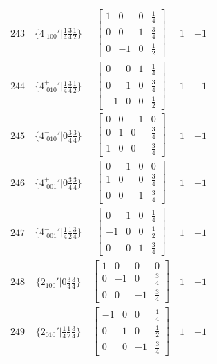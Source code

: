 \documentclass[fleqn,8pt]{jsarticle}
\begin{document}
\begin{longtable}{ccccc}
$ 243 $ & $ \{4^{-}_{\,\,100}{}'|\frac{1}{4} \frac{3}{4} \frac{1}{2}\} $ & $ \begin{bmatrix} 1 & 0 & 0 & \frac{1}{4} \\ 0 & 0 & 1 & \frac{3}{4} \\ 0 & -1 & 0 & \frac{1}{2} \end{bmatrix} $ & $ 1 $ & $ -1 $ \\ \hline
$ 244 $ & $ \{4^{+}_{\,\,010}{}'|\frac{1}{4} \frac{3}{4} \frac{1}{2}\} $ & $ \begin{bmatrix} 0 & 0 & 1 & \frac{1}{4} \\ 0 & 1 & 0 & \frac{3}{4} \\ -1 & 0 & 0 & \frac{1}{2} \end{bmatrix} $ & $ 1 $ & $ -1 $ \\ \hline
$ 245 $ & $ \{4^{-}_{\,\,010}{}'|0 \frac{3}{4} \frac{3}{4}\} $ & $ \begin{bmatrix} 0 & 0 & -1 & 0 \\ 0 & 1 & 0 & \frac{3}{4} \\ 1 & 0 & 0 & \frac{3}{4} \end{bmatrix} $ & $ 1 $ & $ -1 $ \\ \hline
$ 246 $ & $ \{4^{+}_{\,\,001}{}'|0 \frac{3}{4} \frac{3}{4}\} $ & $ \begin{bmatrix} 0 & -1 & 0 & 0 \\ 1 & 0 & 0 & \frac{3}{4} \\ 0 & 0 & 1 & \frac{3}{4} \end{bmatrix} $ & $ 1 $ & $ -1 $ \\ \hline
$ 247 $ & $ \{4^{-}_{\,\,001}{}'|\frac{1}{4} \frac{1}{2} \frac{3}{4}\} $ & $ \begin{bmatrix} 0 & 1 & 0 & \frac{1}{4} \\ -1 & 0 & 0 & \frac{1}{2} \\ 0 & 0 & 1 & \frac{3}{4} \end{bmatrix} $ & $ 1 $ & $ -1 $ \\ \hline
$ 248 $ & $ \{2{}_{100}{}'|0 \frac{3}{4} \frac{3}{4}\} $ & $ \begin{bmatrix} 1 & 0 & 0 & 0 \\ 0 & -1 & 0 & \frac{3}{4} \\ 0 & 0 & -1 & \frac{3}{4} \end{bmatrix} $ & $ 1 $ & $ -1 $ \\ \hline
$ 249 $ & $ \{2{}_{010}{}'|\frac{1}{4} \frac{1}{2} \frac{3}{4}\} $ & $ \begin{bmatrix} -1 & 0 & 0 & \frac{1}{4} \\ 0 & 1 & 0 & \frac{1}{2} \\ 0 & 0 & -1 & \frac{3}{4} \end{bmatrix} $ & $ 1 $ & $ -1 $ \\ \hline

\end{longtable}
\end{document}
